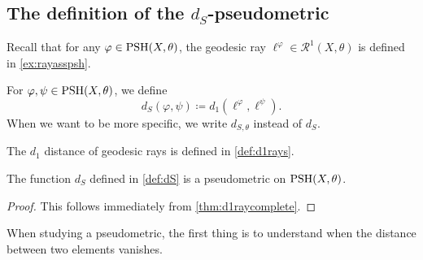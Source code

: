 \subsection{The definition of the \texorpdfstring{$d_S$}{dS}-pseudometric}
\label{subsec:dS_def}
Recall that for any $\varphi\in \mathrm{PSH}(X,\theta)$, the geodesic ray $\ell^{\varphi}\in \mathcal{R}^1(X,\theta)$ is defined in \cref{ex:rayasspsh}.
\begin{definition}\label{def:dS}
    For $\varphi,\psi\in \mathrm{PSH}(X,\theta)$, we define
    \[
        d_S(\varphi,\psi)\coloneqq d_1(\ell^{\varphi},\ell^{\psi}).
    \]
    When we want to be more specific, we write $d_{S,\theta}$ instead of $d_S$.
\end{definition}
The $d_1$ distance of geodesic rays is defined in \cref{def:d1rays}.

\begin{proposition}\label{prop:comp:L686}
    The function $d_S$ defined in \cref{def:dS} is a pseudometric on $\mathrm{PSH}(X,\theta)$.
\end{proposition}
\begin{proof}
    This follows immediately from \cref{thm:d1raycomplete}.
\end{proof}
When studying a pseudometric, the first thing is to understand when the distance between two elements vanishes.

